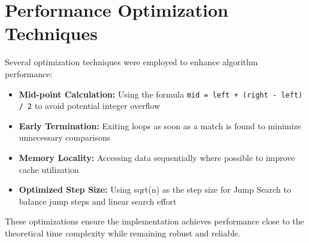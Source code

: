 \section{Performance Optimization Techniques}

Several optimization techniques were employed to enhance algorithm performance:

\begin{itemize}
    \item \textbf{Mid-point Calculation:} Using the formula \texttt{mid = left + (right - left) / 2} to avoid potential integer overflow
    \item \textbf{Early Termination:} Exiting loops as soon as a match is found to minimize unnecessary comparisons
    \item \textbf{Memory Locality:} Accessing data sequentially where possible to improve cache utilization
    \item \textbf{Optimized Step Size:} Using sqrt(n) as the step size for Jump Search to balance jump steps and linear search effort
\end{itemize}

These optimizations ensure the implementation achieves performance close to the theoretical time complexity while remaining robust and reliable.